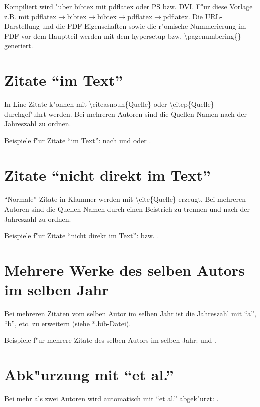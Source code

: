 \documentclass[a4paper,bibtotoc,oneside]{scrbook}
\begin{document}
Kompiliert wird "uber bibtex mit pdflatex oder PS bzw. DVI.
F"ur diese Vorlage z.B. mit pdflatex$\rightarrow$bibtex$\rightarrow$bibtex$\rightarrow$pdflatex$\rightarrow$pdflatex. Die URL-Darstellung und die PDF Eigenschaften sowie die r"omische Nummerierung im PDF vor dem Hauptteil werden mit dem hypersetup bzw. \textbackslash pagenumbering\{\} generiert.\\


\section{Zitate ``im Text''}

In-Line Zitate k"onnen mit \textbackslash citeasnoun\{Quelle\} oder \textbackslash citep\{Quelle\} durchgef"uhrt werden. Bei mehreren Autoren sind die Quellen-Namen nach der Jahreszahl zu ordnen.

Beispiele f"ur Zitate ``im Text'': nach  und  oder \citep{Kessler11}.\\

\section{Zitate ``nicht direkt im Text''}

``Normale'' Zitate in Klammer werden mit \textbackslash cite\{Quelle\} erzeugt. Bei mehreren Autoren sind die Quellen-Namen durch einen Beistrich zu trennen und nach der Jahreszahl zu ordnen.

Beispiele f"ur Zitate ``nicht direkt im Text'': \cite{Technikum11} bzw. \cite{Bach82,Zettler98,Astrom01}.

\section{Mehrere Werke des selben Autors im selben Jahr}

Bei mehreren Zitaten vom selben Autor im selben Jahr ist die Jahreszahl mit ``a'', ``b'', etc. zu erweitern (siehe *.bib-Datei).

Beispiele f"ur mehrere Zitate des selben Autors im selben Jahr: \cite{Aangerman09a} und \cite{Aangerman09b}.\\

\section{Abk"urzung mit ``et al.''}

Bei mehr als zwei Autoren wird automatisch mit ``et al.'' abgek"urzt: \cite{Zettler98}.
\end{document}
